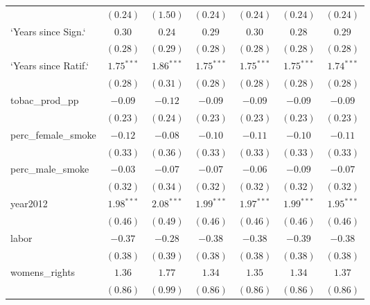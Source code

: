 \begin{table}[!h]
\begin{center}
\begin{tabular}{l c c c c c c }
                        & $(0.24)$     & $(1.50)$     & $(0.24)$     & $(0.24)$     & $(0.24)$     & $(0.24)$     \\
`Years since Sign.`     & $0.30$       & $0.24$       & $0.29$       & $0.30$       & $0.28$       & $0.29$       \\
                        & $(0.28)$     & $(0.29)$     & $(0.28)$     & $(0.28)$     & $(0.28)$     & $(0.28)$     \\
`Years since Ratif.`    & $1.75^{***}$ & $1.86^{***}$ & $1.75^{***}$ & $1.75^{***}$ & $1.75^{***}$ & $1.74^{***}$ \\
                        & $(0.28)$     & $(0.31)$     & $(0.28)$     & $(0.28)$     & $(0.28)$     & $(0.28)$     \\
tobac\_prod\_pp         & $-0.09$      & $-0.12$      & $-0.09$      & $-0.09$      & $-0.09$      & $-0.09$      \\
                        & $(0.23)$     & $(0.24)$     & $(0.23)$     & $(0.23)$     & $(0.23)$     & $(0.23)$     \\
perc\_female\_smoke     & $-0.12$      & $-0.08$      & $-0.10$      & $-0.11$      & $-0.10$      & $-0.11$      \\
                        & $(0.33)$     & $(0.36)$     & $(0.33)$     & $(0.33)$     & $(0.33)$     & $(0.33)$     \\
perc\_male\_smoke       & $-0.03$      & $-0.07$      & $-0.07$      & $-0.06$      & $-0.09$      & $-0.07$      \\
                        & $(0.32)$     & $(0.34)$     & $(0.32)$     & $(0.32)$     & $(0.32)$     & $(0.32)$     \\
year2012                & $1.98^{***}$ & $2.08^{***}$ & $1.99^{***}$ & $1.97^{***}$ & $1.99^{***}$ & $1.95^{***}$ \\
                        & $(0.46)$     & $(0.49)$     & $(0.46)$     & $(0.46)$     & $(0.46)$     & $(0.46)$     \\
labor                   & $-0.37$      & $-0.28$      & $-0.38$      & $-0.38$      & $-0.39$      & $-0.38$      \\
                        & $(0.38)$     & $(0.39)$     & $(0.38)$     & $(0.38)$     & $(0.38)$     & $(0.38)$     \\
womens\_rights          & $1.36$       & $1.77$       & $1.34$       & $1.35$       & $1.34$       & $1.37$       \\
                        & $(0.86)$     & $(0.99)$     & $(0.86)$     & $(0.86)$     & $(0.86)$     & $(0.86)$     \\

\end{tabular}
\end{center}
\end{table}
